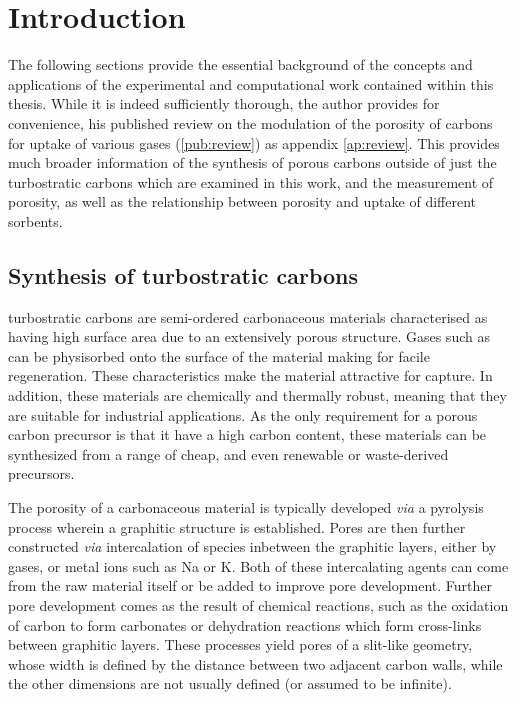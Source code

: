 \chapter{Introduction}
\label{ch:introduction}
The following sections provide the essential background of the concepts and applications of the experimental and computational work contained within this thesis. While it is indeed sufficiently thorough, the author provides for convenience, his published review on the modulation of the porosity of carbons for uptake of various gases (\ref{pub:review}) as appendix \ref{ap:review}. This provides much broader information of the synthesis of porous carbons outside of just the \glspl{turbostratic carbon} which are examined in this work, and the measurement of porosity, as well as the relationship between porosity and uptake of different sorbents. 

\newpage

\section{Synthesis of turbostratic carbons}

\Glspl{turbostratic carbon} are semi-ordered carbonaceous materials characterised as having high surface area due to an extensively porous structure. Gases such as  can be physisorbed onto the surface of the material making for facile regeneration.\citep{Kuramochi2012Comparative, Ghosh2016} These characteristics make the material attractive for  capture. In addition, these materials are chemically and thermally robust, meaning that they are suitable for industrial applications.\citep{Kuramochi2012Comparative, Coromina2016, HaffnerStaton2016High} As the only requirement for a porous carbon precursor  is  that  it have a high carbon content,  these materials can be  synthesized  from a  range  of cheap, and even renewable or waste-derived precursors.\citep{Sevilla2014Energy, Sun2017, Titirici2010Chemistry, Blankenship2017Cigarette, Ariharan2018}

The porosity of a carbonaceous material is typically developed \textit{via} a pyrolysis process wherein a graphitic structure is established. Pores are then further constructed \textit{via} intercalation of species inbetween the graphitic layers, either by gases,\citep{Gonzalez2009} or metal ions such as Na or K.\citep{Sevilla2014Energy, Osswald2009Porosity, Wang2012KOH, RuizFernandez2011} Both of these intercalating agents can come from the raw material itself or be added to improve pore development. Further pore development comes as the result of chemical reactions, such as the oxidation of carbon to form carbonates or dehydration reactions which form cross-links between graphitic layers.\citep{Sevilla2014Energy, Wang2012KOH, Prahas2008} These processes yield pores of a slit-like geometry, whose width is defined by the distance between two adjacent carbon walls, while the other dimensions are not usually defined (or assumed to be infinite).\citep{Sevilla2019, Everett1976Adsorption}

